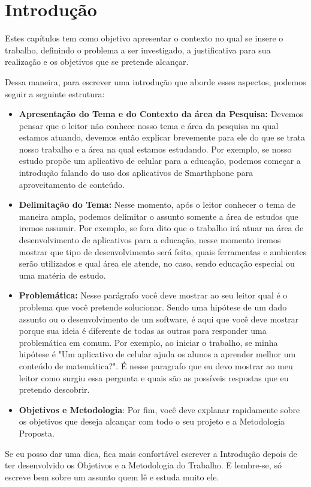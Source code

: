 \chapter{Introdução}\label{ch:introducao}


Estes capítulos tem como objetivo apresentar o contexto no qual se insere o trabalho, definindo o problema a ser investigado, a justificativa para sua realização e os objetivos que se pretende alcançar.

Dessa maneira, para escrever uma introdução que aborde esses aspectos, podemos seguir a seguinte estrutura:

\begin{itemize} 
    \item \textbf{Apresentação do Tema e do Contexto da área da Pesquisa:} Devemos pensar que o leitor não conhece nosso tema e área da pesquisa na qual estamos atuando, devemos então explicar brevemente para ele do que se trata nosso trabalho e a área na qual estamos estudando. Por exemplo, se nosso estudo propõe um aplicativo de celular para a educação, podemos começar a introdução falando do uso dos aplicativos de Smarthphone para aproveitamento de conteúdo.  
    
    \item \textbf{Delimitação do Tema:} Nesse momento, após o leitor conhecer o tema de maneira ampla, podemos delimitar o assunto somente a área de estudos que iremos assumir. Por exemplo, se fora dito que o trabalho irá atuar na área de desenvolvimento de aplicativos para a educação, nesse momento iremos mostrar que tipo de desenvolvimento será feito, quais ferramentas e ambientes serão utilizados e qual área ele atende, no caso, sendo educação especial ou uma matéria de estudo.
    
    \item \textbf{Problemática:} Nesse parágrafo você deve mostrar ao seu leitor qual é o problema que você pretende solucionar. Sendo uma hipótese de um dado assunto ou o desenvolvimento de um software, é aqui que você deve mostrar porque sua ideia é diferente de todas as outras para responder uma problemática em comum. Por exemplo, ao iniciar o trabalho, se minha hipótese é "Um aplicativo de celular ajuda os alunos a aprender melhor um conteúdo de matemática?". É nesse paragrafo que eu devo mostrar ao meu leitor como surgiu essa pergunta e quais são as possíveis respostas que eu pretendo descobrir.
    
    \item \textbf{Objetivos e Metodologia}: Por fim, você deve explanar rapidamente sobre os objetivos que deseja alcançar com todo o seu projeto e a Metodologia Proposta.
\end{itemize}

Se eu posso dar uma dica, fica mais confortável escrever a Introdução depois de ter desenvolvido os Objetivos e a Metodologia do Trabalho.
E lembre-se, só escreve bem sobre um assunto quem lê e estuda muito ele.

